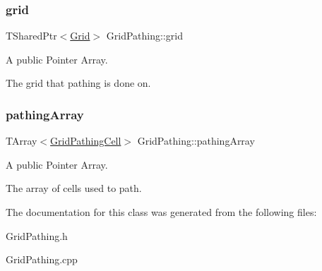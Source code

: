 \subsubsection{\texorpdfstring{grid}{grid}}
{\footnotesize\ttfamily T\+Shared\+Ptr$<$\hyperlink{class_grid}{Grid}$>$ Grid\+Pathing\+::grid}



A public Pointer Array. 

The grid that pathing is done on. \hypertarget{class_grid_pathing_abe2319f19bada22c1a20e5ae544b1ed2}{}\label{class_grid_pathing_abe2319f19bada22c1a20e5ae544b1ed2} 
\subsubsection{\texorpdfstring{pathing\+Array}{pathingArray}}
{\footnotesize\ttfamily T\+Array$<$\hyperlink{class_grid_pathing_cell}{Grid\+Pathing\+Cell}$>$ Grid\+Pathing\+::pathing\+Array}



A public Pointer Array. 

The array of cells used to path. 

The documentation for this class was generated from the following files\+:\begin{DoxyCompactItemize}
\item 
Grid\+Pathing.\+h\item 
Grid\+Pathing.\+cpp\end{DoxyCompactItemize}
